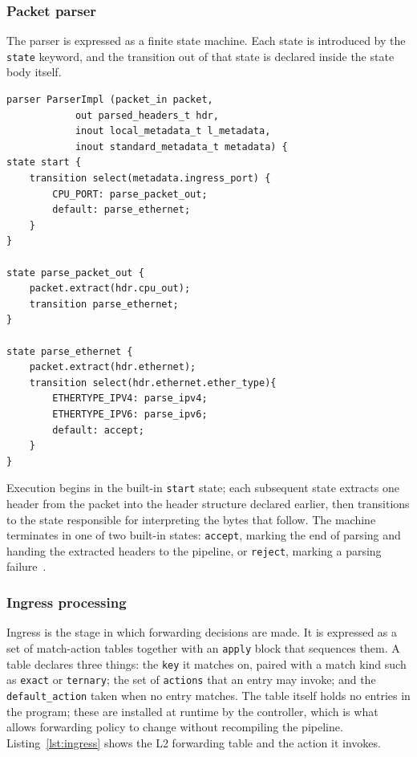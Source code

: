 \subsubsection{Packet parser}
The parser is expressed as a finite state machine. Each state is introduced by the \texttt{state} keyword, and the transition out of that state is declared inside the state body itself. 

\begin{lstlisting}[caption={Parser state machine in \texttt{main.p4}.},label={lst:parser}]
parser ParserImpl (packet_in packet,
            out parsed_headers_t hdr,
            inout local_metadata_t l_metadata,
            inout standard_metadata_t metadata) {
state start {
    transition select(metadata.ingress_port) {
        CPU_PORT: parse_packet_out;
        default: parse_ethernet;
    }
}

state parse_packet_out {
    packet.extract(hdr.cpu_out);
    transition parse_ethernet;
}

state parse_ethernet {
    packet.extract(hdr.ethernet);
    transition select(hdr.ethernet.ether_type){
        ETHERTYPE_IPV4: parse_ipv4;
        ETHERTYPE_IPV6: parse_ipv6;
        default: accept;
    }
}
\end{lstlisting}

Execution begins in the built-in \texttt{start} state; each subsequent state extracts one header from the packet into the header structure declared earlier, then transitions to the state responsible for interpreting the bytes that follow. The machine terminates in one of two built-in states: \texttt{accept}, marking the end of parsing and handing the extracted headers to the pipeline, or \texttt{reject}, marking a parsing failure~\cite{p4spec}.

\subsubsection{Ingress processing}
Ingress is the stage in which forwarding decisions are made. It is expressed as a set of match-action tables together with an \texttt{apply} block that sequences them. A table declares three things: the \texttt{key} it matches on, paired with a match kind such as \texttt{exact} or \texttt{ternary}; the set of \texttt{actions} that an entry may invoke; and the \texttt{default\_action} taken when no entry matches. The table itself holds no entries in the program; these are installed at runtime by the controller, which is what allows forwarding policy to change without recompiling the pipeline. Listing~\ref{lst:ingress} shows the L2 forwarding table and the action it invokes.

